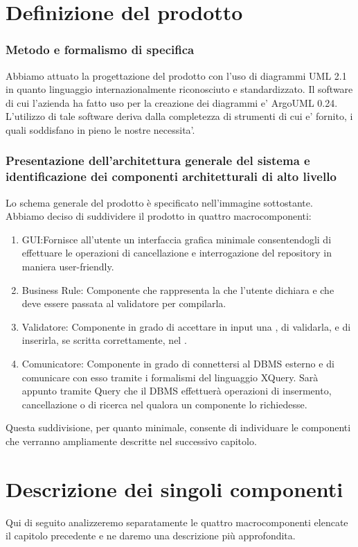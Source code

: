 \documentclass[11pt,titlepage,a4paper]{report}
\begin{document}
\chapter{Definizione del prodotto}
\subsection{Metodo e formalismo di specifica}
Abbiamo attuato la progettazione del prodotto con l'uso di diagrammi UML 2.1 in quanto linguaggio internazionalmente riconosciuto e standardizzato.
Il software di cui l’azienda ha fatto uso per la creazione dei diagrammi e' ArgoUML 0.24. L'utilizzo di tale software deriva dalla completezza
di strumenti di cui e' fornito, i quali soddisfano in pieno le nostre necessita'.

\subsection{Presentazione dell'architettura generale del sistema e identificazione dei componenti architetturali di alto livello}
Lo schema generale del prodotto è specificato nell'immagine sottostante.
Abbiamo deciso di suddividere il prodotto in quattro macrocomponenti:
\begin{enumerate}
 \item GUI:Fornisce all'utente un interfaccia grafica minimale consentendogli di effettuare le operazioni di cancellazione e interrogazione del repository in maniera user-friendly.
\item Business Rule: Componente che rappresenta la \br che l'utente dichiara e che deve essere passata al validatore per compilarla.
\item Validatore: Componente in grado di accettare in input una \br, di validarla, e di inserirla, se scritta correttamente, nel \re.
\item Comunicatore: Componente in grado di connettersi al DBMS esterno e di comunicare con esso tramite i formalismi del linguaggio XQuery.
Sar\`a appunto tramite Query che il DBMS effettuer\`a operazioni di insermento, cancellazione o di ricerca nel \re qualora un componente lo richiedesse.
\end{enumerate}
Questa suddivisione, per quanto minimale, consente di individuare le componenti che verranno ampliamente descritte nel successivo capitolo.

\chapter{Descrizione dei singoli componenti}
Qui di seguito analizzeremo separatamente le quattro macrocomponenti elencate il capitolo precedente e ne daremo una descrizione pi\`u approfondita.
\end{document}

